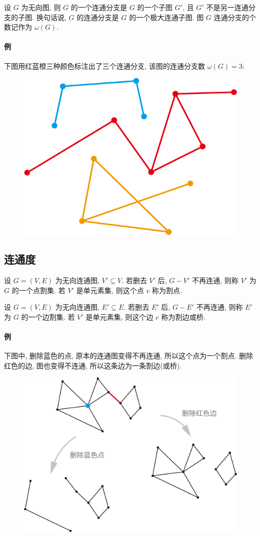 \documentclass[UTF8]{ctexart}
\theoremstyle{mystyle}
\theoremstyle{myremark}
\theoremstyle{plain}
\begin{document}
\begin{definition}
    设 $ G $ 为无向图, 则 $ G $ 的一个连通分支是 $ G $ 的一个子图 $ G' $, 且 $ G' $ 不是另一连通分支的子图. 换句话说, $ G $ 的连通分支是 $ G $ 的一个极大连通子图. 图 $ G $ 连通分支的个数记作为 $ \omega(G) $.
\end{definition}

\paragraph{例}
下图用红蓝橙三种颜色标注出了三个连通分支, 该图的连通分支数 $ \omega(G) = 3 $:
\begin{figure}[H]
    \centering
    \includegraphics[width = 0.3\linewidth]{./images/branch.png}
\end{figure}



\subsection{连通度}
\begin{definition}
    设 $ G = (V, E) $ 为无向连通图, $ V' \subseteq V $. 若删去 $ V' $ 后, $ G - V' $ 不再连通, 则称 $ V' $ 为 $ G $ 的一个点割集. 若 $ V' $ 是单元素集, 则这个点 $ v $ 称为割点.
\end{definition}

\begin{definition}
    设 $ G = (V, E) $ 为无向连通图, $ E' \subseteq E $. 若删去 $ E' $ 后, $ G - E' $ 不再连通, 则称 $ E' $ 为 $ G $ 的一个边割集. 若 $ V' $ 是单元素集, 则这个边 $ e $ 称为割边或桥.
\end{definition}

\paragraph{例}
下图中, 删除蓝色的点, 原本的连通图变得不再连通, 所以这个点为一个割点. 删除红色的边, 图也变得不连通, 所以这条边为一条割边(或桥).
\begin{figure}[H]
    \centering
    \includegraphics[width = 0.7\linewidth]{./images/bridge.png}
\end{figure}
\end{document}
